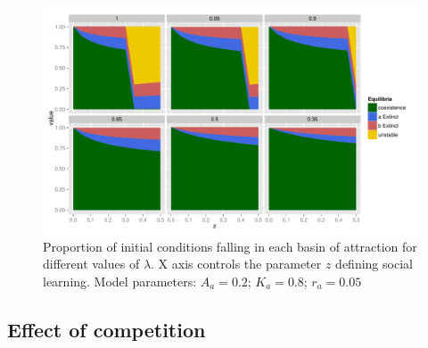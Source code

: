 \documentclass[review,authoryear]{elsarticle}
\begin{document}
\begin{figure}
  \centering
      \includegraphics[width=\textwidth]{./figures/figure6}
  \caption{Proportion of initial conditions falling in each basin of attraction for different values of $\lambda$. X axis controls the parameter $z$ defining social learning. Model parameters: $A_a=0.2$; $K_a=0.8$; $r_a=0.05$}
    \label{fig:percentages}
\end{figure}

\subsection{Effect of competition}
\end{document}

